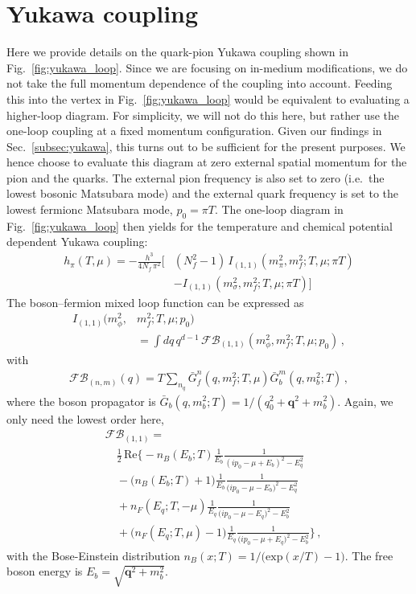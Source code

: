 \documentclass[reprint,english,superscriptaddress,preprintnumbers,amsmath,amssymb,aps,prd]{revtex4-2}
\def\Fig#1{Fig.~\ref{#1}}
\def\Sec#1{Sec.~\ref{#1}}
\begin{document}
\section{Yukawa coupling}\label{app:yuk}

Here we provide details on the quark-pion Yukawa coupling shown in \Fig{fig:yukawa_loop}. Since we are focusing on in-medium modifications, we do not take the full momentum dependence of the coupling into account. Feeding this into the vertex in \Fig{fig:yukawa_loop} would be equivalent to evaluating a higher-loop diagram. For simplicity, we will not do this here, but rather use the one-loop coupling at a fixed momentum configuration. Given our findings in \Sec{subsec:yukawa}, this turns out to be sufficient for the present purposes. We hence choose to evaluate this diagram at zero external spatial momentum for the pion and the quarks. The external pion frequency is also set to zero (i.e.\ the lowest bosonic Matsubara mode) and the external quark frequency is set to the lowest fermionc Matsubara mode, $p_0=\pi T$. The one-loop diagram in \Fig{fig:yukawa_loop} then yields for the temperature and chemical potential dependent Yukawa coupling:
%
\begin{align}
h_{\pi}(T,\mu)=-\frac{h^3}{4N_f\,\pi^2}\bigg[&(N_f^2-1)\,I_{(1,1)}(m^2_\pi,m^2_f;T,\mu;\pi T)\nonumber\\[2ex]
&-I_{(1,1)}(m^2_\sigma,m^2_f;T,\mu;\pi T)\bigg]
\end{align}
%
The boson–fermion mixed loop function can be expressed as 
%
\begin{align}
I_{(1,1)}(m^2_\phi,&m^2_f;T,\mu;p_0)\nonumber\\[2ex]
&=\int dq\,q^{d-1}\,\mathcal{FB}_{(1,1)}(m^2_\phi,m^2_f;T,\mu;p_0)\,,
\end{align}
%
with 
%
\begin{align}
\mathcal{FB}_{(n,m)}(q)=T\sum_{n_q} \bar{G}^n_{f}(q,m^2_f;T,\mu)\bar{G}^m_{b}(q,m^2_b;T)\,,
\end{align}
%
where the boson propagator is $\bar G_b(q,m^2_b;T)=1/(q_0^2+\boldsymbol{q}^2+m_b^2)$. Again, we only need the lowest order here,
%
\begin{align}\label{eq:FB11}
&\mathcal{FB}_{(1,1)}=\nonumber\\
&\quad\frac{1}{2}\,\mathrm{Re}\bigg\{-n_B(E_b;T)\frac{1}{E_b}\frac{1}{(ip_0-\mu+E_b)^2-E_q^2}\nonumber\\[2ex]
&\quad-\big(n_B(E_b;T)+1\big)\frac{1}{E_b}\frac{1}{\big(ip_0-\mu-E_b\big)^2-E_q^2}\nonumber\\[2ex]
&\quad+n_F(E_q;T,-\mu)\frac{1}{E_q}\frac{1}{\big(ip_0-\mu-E_q\big)^2-E_b^2}\nonumber\\[2ex]
&\quad+\big(n_F(E_q;T,\mu)-1\big)\frac{1}{E_q}\frac{1}{\big(ip_0-\mu+E_q\big)^2-E_b^2}\bigg\}\,,
\end{align}
%
with the Bose-Einstein distribution $n_B(x;T)=1/\big(\mathrm{exp}(x/T)-1\big)$. The free boson energy is $E_b=\sqrt{\boldsymbol{q}^2+m_b^2}$. 
\end{document}
